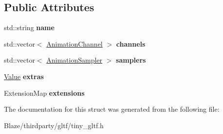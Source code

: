 \subsection*{Public Attributes}
\begin{DoxyCompactItemize}
\item 
\mbox{\label{structtinygltf_1_1Animation_a5944a06c5ad19b89ec38cfd28c60cc16}} 
std\+::string {\bfseries name}
\item 
\mbox{\label{structtinygltf_1_1Animation_a763c46a78d4f95539536d67d6c9eaaec}} 
std\+::vector$<$ \hyperlink{structtinygltf_1_1AnimationChannel}{Animation\+Channel} $>$ {\bfseries channels}
\item 
\mbox{\label{structtinygltf_1_1Animation_aa15630bd3ff952d0fac6fb7778a55a49}} 
std\+::vector$<$ \hyperlink{structtinygltf_1_1AnimationSampler}{Animation\+Sampler} $>$ {\bfseries samplers}
\item 
\mbox{\label{structtinygltf_1_1Animation_aa0e373e4444bc345c5265e12942e0e38}} 
\hyperlink{classtinygltf_1_1Value}{Value} {\bfseries extras}
\item 
\mbox{\label{structtinygltf_1_1Animation_a944167ab143dc1cb182ba9c8aec254c1}} 
Extension\+Map {\bfseries extensions}
\end{DoxyCompactItemize}


The documentation for this struct was generated from the following file\+:\begin{DoxyCompactItemize}
\item 
Blaze/thirdparty/gltf/tiny\+\_\+gltf.\+h\end{DoxyCompactItemize}
